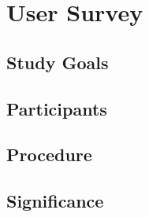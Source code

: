 \chapter{User Survey}
\label{chap:usability}

\section{Study Goals}

\section{Participants}

\section{Procedure}

\section{Significance}